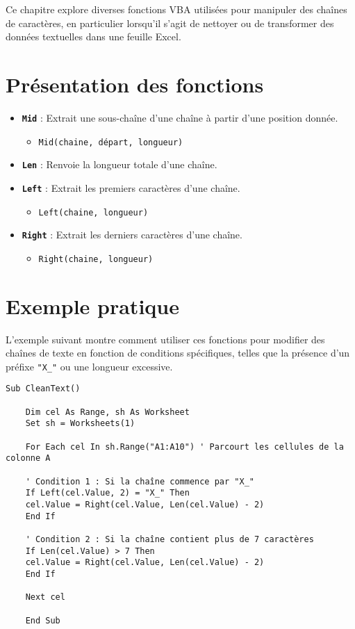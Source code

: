 \documentclass[a4paper,12pt]{report}
\begin{document}
Ce chapitre explore diverses fonctions VBA utilisées pour manipuler des chaînes de caractères, en particulier lorsqu'il s'agit de nettoyer ou de transformer des données textuelles dans une feuille Excel.

\section{Présentation des fonctions}

\begin{itemize}
	\item \textbf{\texttt{Mid}} : Extrait une sous-chaîne d'une chaîne à partir d'une position donnée.
	\begin{itemize}
		\item \texttt{Mid(chaine, départ, longueur)}
	\end{itemize}
	\item \textbf{\texttt{Len}} : Renvoie la longueur totale d'une chaîne.
	\item \textbf{\texttt{Left}} : Extrait les premiers caractères d'une chaîne.
	\begin{itemize}
		\item \texttt{Left(chaine, longueur)}
	\end{itemize}
	\item \textbf{\texttt{Right}} : Extrait les derniers caractères d'une chaîne.
	\begin{itemize}
		\item \texttt{Right(chaine, longueur)}
	\end{itemize}
\end{itemize}

\section{Exemple pratique}

L'exemple suivant montre comment utiliser ces fonctions pour modifier des chaînes de texte en fonction de conditions spécifiques, telles que la présence d'un préfixe \texttt{"X\_"} ou une longueur excessive.
\newpage
\begin{lstlisting}[language=vbscript, caption={Exemple avec \texttt{Left}, \texttt{Right}, \texttt{Mid}, et \texttt{Len}}]
	Sub CleanText()
	
	Dim cel As Range, sh As Worksheet
	Set sh = Worksheets(1)
	
	For Each cel In sh.Range("A1:A10") ' Parcourt les cellules de la colonne A
	
	' Condition 1 : Si la chaîne commence par "X_"
	If Left(cel.Value, 2) = "X_" Then
	cel.Value = Right(cel.Value, Len(cel.Value) - 2)
	End If
	
	' Condition 2 : Si la chaîne contient plus de 7 caractères
	If Len(cel.Value) > 7 Then
	cel.Value = Right(cel.Value, Len(cel.Value) - 2)
	End If
	
	Next cel
	
	End Sub
\end{lstlisting}
\end{document}
